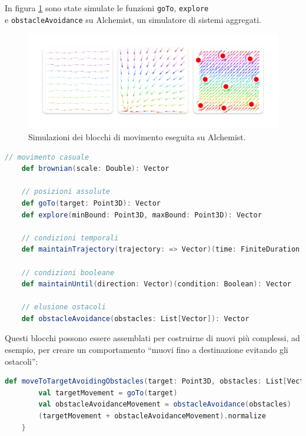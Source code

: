 \documentclass[12pt,a4paper,openright,twoside]{book}
\begin{document}
In figura \cref{fig:movement-simulations} \cite{Macroswarm} sono state simulate le funzioni \verb|goTo|, \verb|explore| \\ e \verb|obstacleAvoidance| su Alchemist, un simulatore di sistemi aggregati.

\begin{figure}
    \centering
    \includegraphics[width=.9\linewidth]{figures/movement-simulations.pdf}
    \caption{Simulazioni dei blocchi di movimento eseguita su Alchemist.}
    \label{fig:movement-simulations}
\end{figure}

\begin{lstlisting}[language=Scala, label={lst:movement-module} caption={Funzioni del modulo di movimento}]
    // movimento casuale
    def brownian(scale: Double): Vector
    
    // posizioni assolute
    def goTo(target: Point3D): Vector
    def explore(minBound: Point3D, maxBound: Point3D): Vector

    // condizioni temporali
    def maintainTrajectory(trajectory: => Vector)(time: FiniteDuration):Vector

    // condizioni booleane
    def maintainUntil(direction: Vector)(condition: Boolean): Vector

    // elusione ostacoli
    def obstacleAvoidance(obstacles: List[Vector]): Vector
\end{lstlisting}

Questi blocchi possono essere assemblati per costruirne di nuovi più complessi, ad esempio, per creare un comportamento ``muovi fino a destinazione evitando gli ostacoli'':

\begin{lstlisting}[language=Scala, label={lst:complex-movement} caption={Comportamento complesso}]
    def moveToTargetAvoidingObstacles(target: Point3D, obstacles: List[Vector]): Vector = {
        val targetMovement = goTo(target)
        val obstacleAvoidanceMovement = obstacleAvoidance(obstacles)
        (targetMovement + obstacleAvoidanceMovement).normalize
    }
\end{lstlisting}
\end{document}
